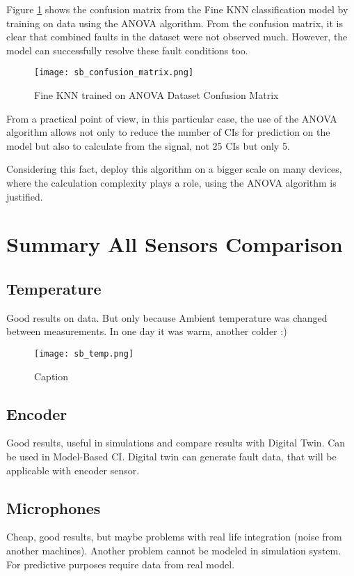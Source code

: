 Figure \ref{fig:conf_matrix} shows the confusion matrix from the Fine KNN
classification model by training on data using the ANOVA algorithm.  From
the confusion matrix, it is clear that combined faults in the dataset were
not observed much. However, the model can successfully resolve these fault
conditions too.

\begin{figure}[h!]
    \centering
    \texttt{[image: sb\_confusion\_matrix.png]}
    \caption{Fine KNN trained on ANOVA Dataset Confusion Matrix}
    \label{fig:conf_matrix}
\end{figure}

From a practical point of view, in this particular case, the use of the
ANOVA algorithm allows not only to reduce the number of CIs for prediction
on the model but also to calculate from the signal, not 25 CIs but only 5. 

Considering this fact, deploy this algorithm on a bigger scale on many
devices, where the calculation complexity plays a role, using the ANOVA
algorithm is justified.

\section{Summary All Sensors Comparison}

\subsection{Temperature}
Good results on data. But only because Ambient temperature was changed
between measurements. In one day it was warm, another colder :)

\begin{figure}[h!]
    \centering
    \texttt{[image: sb\_temp.png]}
    \caption{Caption}
    \label{fig:}
\end{figure}

\subsection{Encoder}
Good results, useful in simulations and compare results with Digital Twin.
Can be used in Model-Based CI. 
Digital twin can generate fault data, that will be applicable with encoder
sensor.

\subsection{Microphones}
Cheap, good results, but maybe problems with real life integration (noise
from another machines). Another problem cannot be modeled in simulation
system. For predictive purposes require data from real model.


